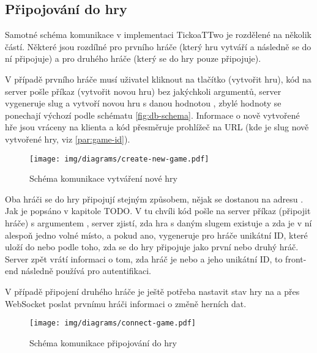 \subsection{Připojování do hry}

Samotné schéma komunikace v implementaci TickoaTTwo je rozdělené na několik
částí. Některé jsou rozdílné pro prvního hráče (který hru vytváří a následně se
do ní připojuje) a pro druhého hráče (který se do hry pouze připojuje).

V případě prvního hráče musí uživatel kliknout na tlačítko 
(vytvořit hru), kód na server pošle příkaz  (vytvořit novou
hru) bez jakýchkoli argumentů, server vygeneruje slug a vytvoří novou hru s
danou hodnotou , zbylé hodnoty se ponechají výchozí podle schématu
\ref{fig:db-schema}. Informace o nově vytvořené hře jsou vráceny na klienta a
kód přesměruje prohlížeč na URL  (kde 
je slug nově vytvořené hry, viz \ref{par:game-id}).

\begin{figure}[h]
    \centering
    \texttt{[image: img/diagrams/create-new-game.pdf]}
    \caption{Schéma komunikace vytváření nové hry}
    \label{fig:create-new-game}
\end{figure}

Oba hráči se do hry připojují stejným způsobem, nějak se dostanou na adresu
. Jak je popsáno v kapitole TODO. V tu chvíli kód pošle na server
příkaz  (připojit hráče) s argumentem , server zjistí,
zda hra s daným slugem existuje a zda je v ní alespoň jedno volné místo, a
pokud ano, vygeneruje pro hráče unikátní ID, které uloží do  nebo
 podle toho, zda se do hry připojuje jako první nebo druhý hráč.
Server zpět vrátí informaci o tom, zda hráč je  nebo  a
jeho unikátní ID, to front-end následně používá pro autentifikaci.

V případě připojení druhého hráče je ještě potřeba nastavit stav hry na
 a přes WebSocket poslat prvnímu hráči informaci o změně
herních dat.

\begin{figure}[h]
    \centering
    \texttt{[image: img/diagrams/connect-game.pdf]}\hspace*{80px}
    \caption[Schéma komunikace připojování do hry]{Schéma komunikace připojování do hry\footnotemark}
    \label{fig:connect-game}
\end{figure}

